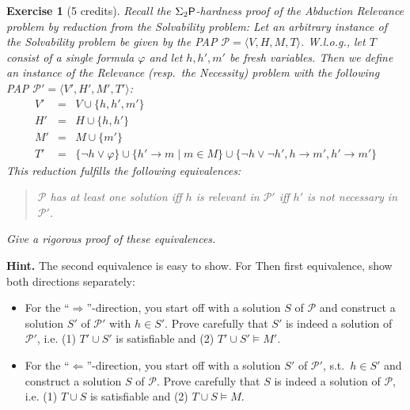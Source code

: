 \documentclass [11pt]{article}
\newcommand{\ra}{\rightarrow}
\newcommand{\Ra}{\Rightarrow}
\newcommand{\La}{\Leftarrow}
\renewcommand{\phi}{\varphi}
\newcommand{\ccfont}[1]{\protect\mathsf{#1}}
\newcommand{\Ptime}{\ccfont{P}}
\newcommand{\phs}[1]{\Sigma_{#1}\Ptime}
\newtheorem{exercise}[theorem]{Exercise}
\begin{document}
\newpage


\noindent
\begin{exercise}[5 credits]
{\em Recall the $\phs{2}$-hardness proof of 
the Abduction Relevance problem by reduction from 
the Solvability problem:
Let an arbitrary instance of the Solvability problem be given 
by the PAP  $\mathcal{P}=\langle V,H,M,T \rangle$. 
W.l.o.g., let $T$ consist of a single formula $\phi$ and
let $h, h',m'$ be fresh variables. Then we define an 
instance of the Relevance (resp.\ the Necessity) problem with the 
following PAP
 $\mathcal{P}'=\langle V', H',M',T' \rangle$:
%
\begin{eqnarray*}
V' &=& V\cup\{h,h',m'\} \\
H' &=& H\cup\{h,h'\} \\
M' &=& M\cup\{m'\}\\
T' &=& \{\neg h \vee \phi\} \cup \{h'\ra m \mid m\in M\} \cup \{\neg h \vee \neg h', h \ra m', h' \ra m'\}
\end{eqnarray*}
%
This reduction fulfills the following equivalences: 

\begin{quote}
$\mathcal{P}$ has at least one
solution iff $h$ is relevant in $\mathcal{P}'$ iff 
$h'$ is not necessary in $\mathcal{P}'$.%
\end{quote}

\smallskip
\noindent
Give a rigorous proof of these equivalences.
} %
\end{exercise}


\noindent
{\bf Hint.} 
The second equivalence is easy to show. For Then first equivalence, 
show both directions separately:


\begin{itemize}
\item 
For the ``$\Ra$''-direction, you start off with a
solution $S$ of $\mathcal{P}$ and construct a solution $S'$ of $\mathcal{P}'$ with $h \in S'$. Prove carefully that $S'$ is indeed a solution of $\mathcal{P}'$, i.e. (1) $T' \cup S'$ is satisfiable
and (2) $T' \cup S' \models M'$. 

\item For the ``$\La$''-direction, you start off with a
solution $S'$ of $\mathcal{P}'$, s.t.\ $h \in S'$ and construct a solution $S$ of $\mathcal{P}$.
Prove carefully that $S$ is indeed a solution of $\mathcal{P}$, i.e. (1) $T \cup S$ is satisfiable
and (2) $T \cup S \models M$. 

\end{itemize}
\end{document}

